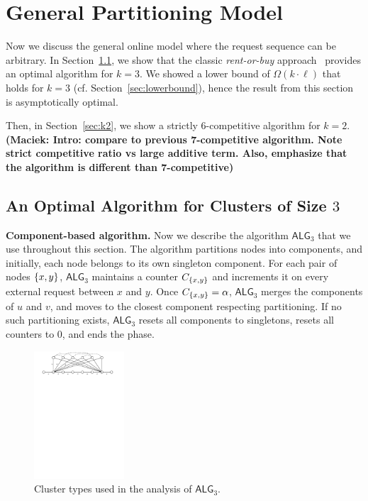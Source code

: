 \documentclass[manuscript,screen=true, review, anonymous]{acmart}
\newcommand{\OPT}{\textsf{OPT}\xspace}
\newcommand{\OBRP}{BRP}
\newcommand{\TAlg}{{\ensuremath{\textsf{ALG}_{3}}}\xspace}
\DeclarePairedDelimiter\set{\{}{\}}
\newcommand\maciek[1]{\color{brown}\textbf{(Maciek: #1)}\color{black}}
\begin{document}

\section{General Partitioning Model}
\label{sec:part}


Now  we discuss the general online
model where the request sequence
can be arbitrary.
In Section~\ref{sec:k3}, we show that the classic \emph{rent-or-buy} approach~\cite{karlin-ski-rental} provides an optimal algorithm for $k=3$.
We showed a lower bound of $\Omega(k \cdot \ell)$ that holds for $k=3$ (cf. Section~\ref{sec:lowerbound}), hence the result from this section is asymptotically optimal.

Then, in Section~\ref{sec:k2}, we show a strictly $6$-competitive algorithm for $k=2$.
\maciek{Intro: compare to previous 7-competitive algorithm. Note strict competitive ratio vs large additive term. Also, emphasize that the algorithm is different than 7-competitive}



\subsection{An Optimal Algorithm for Clusters of Size $3$}
\label{sec:k3}




\noindent
\textbf{Component-based algorithm.}
Now we describe the algorithm \TAlg that we use throughout this section.
The algorithm partitions nodes into components, and
initially, each node belongs to its own singleton component.
For each pair of nodes $\set{x,y}$, \TAlg maintains a counter $C_{\set{x,y}}$ and increments it on every external request between $x$ and $y$.
Once $C_{\set{x,y}} = \alpha$, \TAlg merges the components of $u$ and $v$, and moves to the closest component respecting partitioning.
If no such partitioning exists, \TAlg resets all components to singletons, resets all counters to $0$, and ends the phase.


\begin{figure}[H]
	\centering
	\includegraphics[width=0.3\textwidth]{figs/substitute}
	\caption{Cluster types used in the analysis of \TAlg.}
\end{figure}
\end{document}
